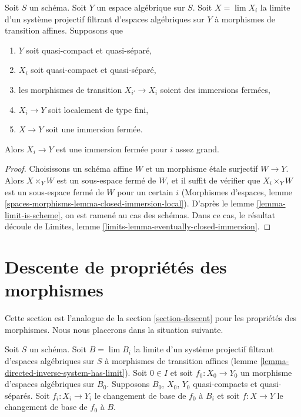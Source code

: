 \begin{lemma}
\label{lemma-eventually-closed-immersion}
Soit $S$ un schéma. Soit $Y$ un espace algébrique sur $S$.
Soit $X = \lim X_i$ la limite d'un système projectif filtrant d'espaces
algébriques sur $Y$ à morphismes de transition affines. Supposons que
\begin{enumerate}
\item $Y$ soit quasi-compact et quasi-séparé,
\item $X_i$ soit quasi-compact et quasi-séparé,
\item les morphismes de transition $X_{i'} \to X_i$ soient des immersions fermées,
\item $X_i \to Y$ soit localement de type fini,
\item $X \to Y$ soit une immersion fermée.
\end{enumerate}
Alors $X_i \to Y$ est une immersion fermée pour $i$ assez grand.
\end{lemma}

\begin{proof}
Choisissons un schéma affine $W$ et un morphisme étale surjectif $W \to Y$.
Alors $X \times_Y W$ est un sous-espace fermé de $W$, et il suffit de vérifier
que $X_i \times_Y W$ est un sous-espace fermé de $W$ pour un certain $i$
(Morphismes d'espaces,
lemme \ref{spaces-morphisms-lemma-closed-immersion-local}). D'après le
lemme \ref{lemma-limit-is-scheme}, on est ramené au cas des schémas.
Dans ce cas, le résultat découle de
Limites, lemme \ref{limits-lemma-eventually-closed-immersion}.
\end{proof}

















\section{Descente de propriétés des morphismes}
\label{section-descent-of-properties}

\noindent
Cette section est l'analogue de la section \ref{section-descent}
pour les propriétés des morphismes. Nous nous placerons dans la situation suivante.

\begin{situation}
\label{situation-descent-property}
Soit $S$ un schéma. Soit $B = \lim B_i$ la limite d'un système projectif filtrant
d'espaces algébriques sur $S$ à morphismes de transition affines
(lemme \ref{lemma-directed-inverse-system-has-limit}).
Soit $0 \in I$ et soit $f_0 : X_0 \to Y_0$ un morphisme d'espaces algébriques
sur $B_0$. Supposons $B_0$, $X_0$, $Y_0$ quasi-compacts et quasi-séparés.
Soit $f_i : X_i \to Y_i$ le changement de base de $f_0$ à $B_i$ et
soit $f : X \to Y$ le changement de base de $f_0$ à $B$.
\end{situation}

